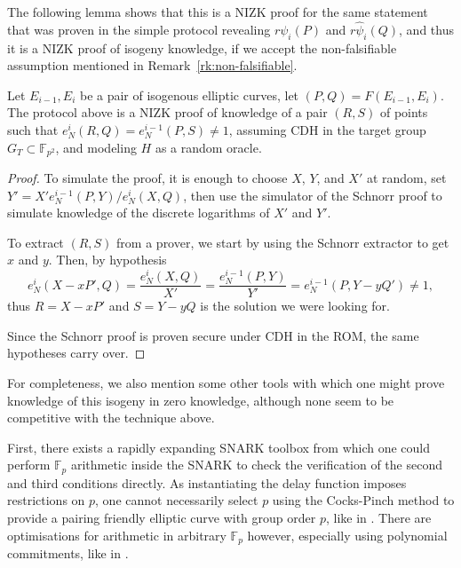 \documentclass{llncs}
\newcommand{\F}{\mathbb{F}}
\begin{document}
The following lemma shows that this is a NIZK proof for the same
statement that was proven in the simple protocol revealing
$r\psi_i(P)$ and $r\hat\psi_i(Q)$, and thus it is a NIZK proof of
isogeny knowledge, if we accept the non-falsifiable assumption
mentioned in Remark~\ref{rk:non-falsifiable}.

\begin{lemma}
  Let $E_{i-1},E_i$ be a pair of isogenous elliptic curves, let
  $(P, Q) = F(E_{i-1},E_i)$. %
  The protocol above is a NIZK proof of knowledge of a pair $(R,S)$ of
  points such that $e_N^i(R,Q) = e_N^{i-1}(P,S) \ne 1$, assuming CDH
  in the target group $G_T\subset\F_{p^2}$, and modeling $H$ as a
  random oracle.
\end{lemma}
\begin{proof}
  To simulate the proof, it is enough to choose $X$, $Y$, and $X'$ at
  random, set $Y' = X'e_N^{i-1}(P,Y)/e_N^i(X,Q)$, then use the
  simulator of the Schnorr proof to simulate knowledge of the discrete
  logarithms of $X'$ and $Y'$.

  To extract $(R,S)$ from a prover, we start by using the Schnorr
  extractor to get $x$ and $y$. %
  Then, by hypothesis
  \[e_N^i(X-xP',Q) = \frac{e_N^i(X,Q)}{X'} = \frac{e_N^{i-1}(P,Y)}{Y'}
    = e_N^{i-1}(P,Y-yQ') \ne 1,\] %
  thus $R=X-xP'$ and $S=Y-yQ$ is the solution we were looking for.

  Since the Schnorr proof is proven secure under CDH in the ROM, the
  same hypotheses carry over.
\end{proof}

For completeness, we also mention some other tools with which one
might prove knowledge of this isogeny in zero knowledge, although none
seem to be competitive with the technique above.
 
First, there exists a rapidly expanding SNARK toolbox from which
one could perform $\F_p$ arithmetic inside the SNARK to check the
verification of the second and third conditions directly.  
As instantiating the delay function imposes restrictions on $p$,
one cannot necessarily select $p$ using the Cocks-Pinch method to
provide a pairing friendly elliptic curve with group order $p$, 
like in \cite{ZEXE}. %
There are optimisations for arithmetic in arbitrary $\F_p$ 
however, especially using polynomial commitments,
like in \cite{plookup}. %
\end{document}
